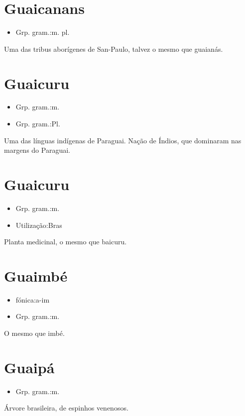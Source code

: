 \section{Guaicanans}
\begin{itemize}
\item {Grp. gram.:m. pl.}
\end{itemize}
Uma das tribus aborígenes de San-Paulo, talvez o mesmo que \textunderscore guaianás\textunderscore .
\section{Guaicuru}
\begin{itemize}
\item {Grp. gram.:m.}
\end{itemize}
\begin{itemize}
\item {Grp. gram.:Pl.}
\end{itemize}
Uma das línguas indígenas de Paraguai.
Nação de Índios, que dominaram nas margens do Paraguai.
\section{Guaicuru}
\begin{itemize}
\item {Grp. gram.:m.}
\end{itemize}
\begin{itemize}
\item {Utilização:Bras}
\end{itemize}
Planta medicinal, o mesmo que \textunderscore baicuru\textunderscore .
\section{Guaimbé}
\begin{itemize}
\item {fónica:a-im}
\end{itemize}
\begin{itemize}
\item {Grp. gram.:m.}
\end{itemize}
O mesmo que \textunderscore imbé\textunderscore .
\section{Guaipá}
\begin{itemize}
\item {Grp. gram.:m.}
\end{itemize}
Árvore brasileira, de espinhos venenosos.
